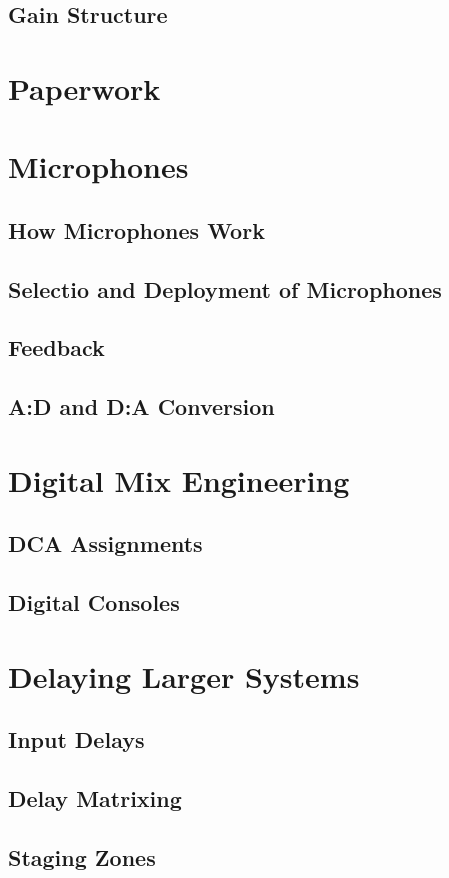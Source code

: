\documentclass[a4paper]{article}
\begin{document}
\subsection{Gain Structure}

\section{Paperwork}

\section{Microphones}

\subsection{How Microphones Work}

\subsection{Selectio and Deployment of Microphones}

\subsection{Feedback}

\subsection{A:D and D:A Conversion}

\section{Digital Mix Engineering}

\subsection{DCA Assignments}

\subsection{Digital Consoles}

\section{Delaying Larger Systems}

\subsection{Input Delays}

\subsection{Delay Matrixing}

\subsection{Staging Zones}
\end{document}
